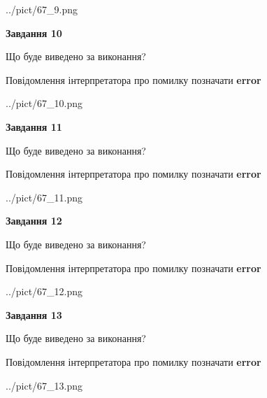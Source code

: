 \documentclass[11pt, ukrainian]{article}
\begin{document}
{\begin {large}
\begin{center}
	{../pict/67_9.png}
\end{center}
\newpage

{\begin {center}\textbf{Завдання 10}\end {center}}\par
Що буде виведено за виконання? \par
Повідомлення інтерпретатора про помилку позначати \textbf{error}

\begin{center}
	{../pict/67_10.png}
\end{center}
\newpage

{\begin {center}\textbf{Завдання 11}\end {center}}\par
Що буде виведено за виконання? \par
Повідомлення інтерпретатора про помилку позначати \textbf{error}

\begin{center}
	{../pict/67_11.png}
\end{center}
\newpage

{\begin {center}\textbf{Завдання 12}\end {center}}\par
Що буде виведено за виконання? \par
Повідомлення інтерпретатора про помилку позначати \textbf{error}

\begin{center}
	{../pict/67_12.png}
\end{center}
\newpage

{\begin {center}\textbf{Завдання 13}\end {center}}\par
Що буде виведено за виконання? \par
Повідомлення інтерпретатора про помилку позначати \textbf{error}

\begin{center}
	{../pict/67_13.png}
\end{center}
\newpage


\end{large}}
\end{document}
